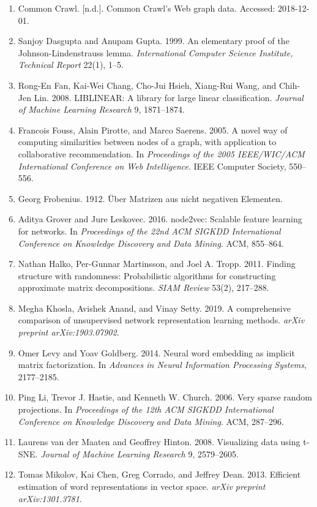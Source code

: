 \documentclass[11pt]{article}
\begin{document}
\begin{enumerate}[leftmargin=1.5em]
    \item Common Crawl. [n.d.]. Common Crawl's Web graph data. Accessed: 2018-12-01.
    \item Sanjoy Dasgupta and Anupam Gupta. 1999. An elementary proof of the Johnson-Lindenstrauss lemma. \emph{International Computer Science Institute, Technical Report} 22(1), 1--5.
    \item Rong-En Fan, Kai-Wei Chang, Cho-Jui Hsieh, Xiang-Rui Wang, and Chih-Jen Lin. 2008. LIBLINEAR: A library for large linear classification. \emph{Journal of Machine Learning Research} 9, 1871--1874.
    \item Francois Fouss, Alain Pirotte, and Marco Saerens. 2005. A novel way of computing similarities between nodes of a graph, with application to collaborative recommendation. In \emph{Proceedings of the 2005 IEEE/WIC/ACM International Conference on Web Intelligence}. IEEE Computer Society, 550--556.
    \item Georg Frobenius. 1912. \"Uber Matrizen aus nicht negativen Elementen.
    \item Aditya Grover and Jure Leskovec. 2016. node2vec: Scalable feature learning for networks. In \emph{Proceedings of the 22nd ACM SIGKDD International Conference on Knowledge Discovery and Data Mining}. ACM, 855--864.
    \item Nathan Halko, Per-Gunnar Martinsson, and Joel A. Tropp. 2011. Finding structure with randomness: Probabilistic algorithms for constructing approximate matrix decompositions. \emph{SIAM Review} 53(2), 217--288.
    \item Megha Khosla, Avishek Anand, and Vinay Setty. 2019. A comprehensive comparison of unsupervised network representation learning methods. \emph{arXiv preprint arXiv:1903.07902}.
    \item Omer Levy and Yoav Goldberg. 2014. Neural word embedding as implicit matrix factorization. In \emph{Advances in Neural Information Processing Systems}, 2177--2185.
    \item Ping Li, Trevor J. Hastie, and Kenneth W. Church. 2006. Very sparse random projections. In \emph{Proceedings of the 12th ACM SIGKDD International Conference on Knowledge Discovery and Data Mining}. ACM, 287--296.
    \item Laurens van der Maaten and Geoffrey Hinton. 2008. Visualizing data using t-SNE. \emph{Journal of Machine Learning Research} 9, 2579--2605.
    \item Tomas Mikolov, Kai Chen, Greg Corrado, and Jeffrey Dean. 2013. Efficient estimation of word representations in vector space. \emph{arXiv preprint arXiv:1301.3781}.

\end{enumerate}
\end{document}
